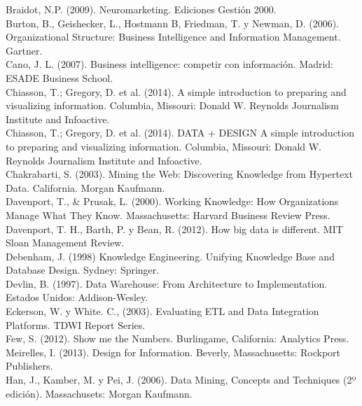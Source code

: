 Braidot, N.P. (2009). Neuromarketing. Ediciones Gestión 2000.\\

Burton, B., Geishecker, L., Hostmann B, Friedman, T. y Newman, D. (2006).
Organizational Structure: Business Intelligence and Information Management.
Gartner.\\

Cano, J. L. (2007). Business intelligence: competir con información. Madrid:
ESADE Business School.\\


Chiasson, T.; Gregory, D. et al. (2014). A simple introduction to preparing and
visualizing information. Columbia, Missouri: Donald W. Reynolds Journalism
Institute and Infoactive.\\

Chiasson, T.; Gregory, D. et al. (2014). DATA + DESIGN A simple introduction to
preparing and visualizing information. Columbia, Missouri: Donald W. Reynolds
Journalism Institute and Infoactive. \\

Chakrabarti, S. (2003). Mining the Web: Discovering Knowledge from Hypertext Data.
California. Morgan Kaufmann.\\

Davenport, T., & Prusak, L. (2000). Working Knowledge: How Organizations Manage
What They Know. Massachusetts: Harvard Business Review Press.\\

Davenport, T. H., Barth, P. y Bean, R. (2012). How big data is different. MIT Sloan
Management Review.\\

Debenham, J. (1998) Knowledge Engineering. Unifying Knowledge Base and Database
Design. Sydney: Springer.\\

Devlin, B. (1997). Data Warehouse: From Architecture to Implementation. Estados
Unidos: Addison-Wesley.\\

Eckerson, W. y White. C., (2003). Evaluating ETL and Data Integration Platforms.
TDWI Report Series.\\

Few, S. (2012). Show me the Numbers. Burlingame, California: Analytics Press.
Meirelles, I. (2013). Design for Information. Beverly, Massachusetts: Rockport
Publishers.\\

Han, J., Kamber, M. y Pei, J. (2006). Data Mining, Concepts and Techniques (2º
edición). Massachusets: Morgan Kaufmann.\\

